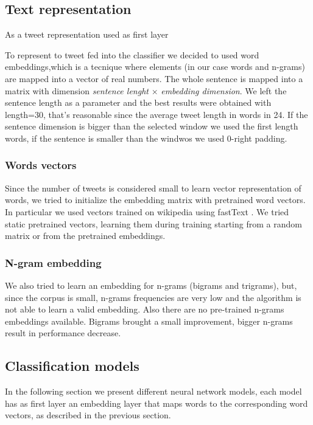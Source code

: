 \subsection{Text representation} \label{subsec:representation}
As a tweet representation used as first layer

To represent to tweet fed into the classifier we decided to used word embeddings,which is a tecnique where elements (in our case words and n-grams) are mapped into a vector of real numbers.
The whole sentence is mapped into a matrix with dimension \emph{sentence lenght} $\times$ \emph{embedding dimension}.
We left the sentence length as a parameter and the best results were obtained with length=30, that's reasonable since the average tweet length in words in 24.
If the sentence dimension is bigger than the selected window we used the first length words, if the sentence is smaller than the windwos we used 0-right padding.

\subsubsection{Words vectors}
Since the number of tweets is considered small to learn vector representation of words, we tried to initialize the embedding matrix with pretrained word vectors.
In particular we used vectors trained on wikipedia using fastText \cite{bojanowski2016enriching}.
We tried static pretrained vectors, learning them during training starting from a random matrix or from the pretrained embeddings.

\subsubsection{N-gram embedding}
We also tried to learn an embedding for n-grams (bigrams and trigrams), but, since the corpus is small, n-grams frequencies are very low and the algorithm is not able to learn a valid embedding.
Also there are no pre-trained n-grams embeddings available.
Bigrams brought a small improvement, bigger n-grams result in performance decrease.



\subsection{Classification models} \label{subsec:classificationModel}
In the following section we present different neural network models, each model has as first layer an embedding layer that maps words to the corresponding word vectors, as described in the previous section.


